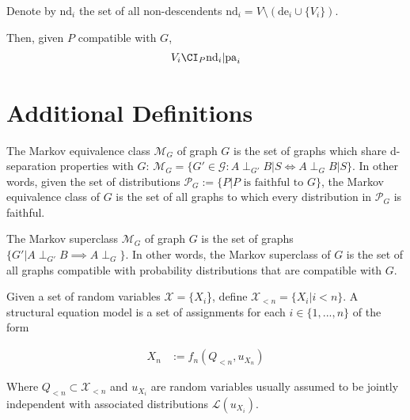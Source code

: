 \begin{definition}\label{def:local_markov}
Denote by $\mathrm{nd}_i$ the set of all non-descendents $\mathrm{nd}_i=V\setminus (\mathrm{de}_i\cup\{V_i\})$.

Then, given $P$ compatible with $G$,
\begin{align}
    V_i \CI_P \mathrm{nd}_i | \mathrm{pa}_i
\end{align}
\end{definition}




\section{Additional Definitions}

\begin{definition}
The Markov equivalence class $\mathcal{M}_G$ of graph $G$ is the set of graphs which share d-separation properties with $G$: $\mathcal{M}_G=\{G'\in\mathcal{G}:A\perp_{G'}B | S \Leftrightarrow A\perp_{G}B|S\}$. In other words, given the set of distributions $\mathcal{P}_G:=\{P|P\text{ is faithful to }G\}$, the Markov equivalence class of $G$ is the set of all graphs to which every distribution in $\mathcal{P}_G$ is faithful.
\end{definition}

\begin{definition}
The Markov superclass $\mathcal{M}_G$ of graph $G$ is the set of graphs $\{G'|A\perp_{G'} B \implies A\perp_G\}$. In other words, the Markov superclass of $G$ is the set of all graphs compatible with probability distributions that are compatible with $G$. 
\end{definition}

\begin{definition}\label{def:structural_equation}
Given a set of random variables $\mathcal{X}=\{X_i$\}, define $\mathcal{X}_{<n}=\{X_i|i<n\}$. A structural equation model is a set of assignments for each $i\in\{1,...,n\}$ of the form

\begin{align*}
    X_n &:= f_n(Q_{<n},u_{X_n})
\end{align*}

Where $Q_{<n}\subset \mathcal{X}_{<n}$ and $u_{X_i}$ are random variables usually assumed to be jointly independent with associated distributions $\mathcal{L}(u_{X_i})$. 
\end{definition}

